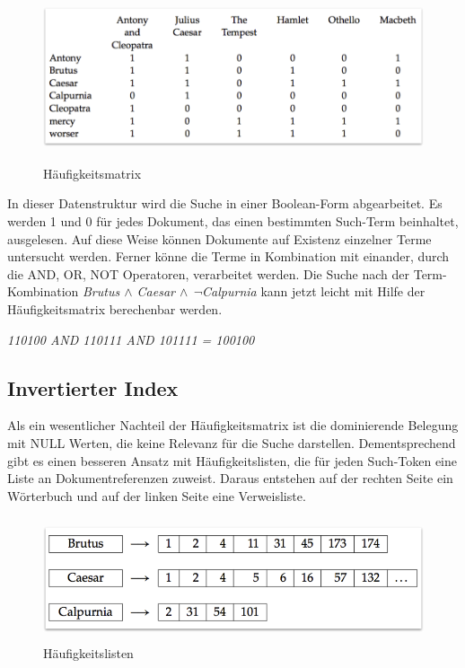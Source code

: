 \begin{figure}
\centering
\includegraphics[width=13.54cm,height=4.955cm]{bilder/SeminararbeitArkadij-img1.png}
\caption {Häufigkeitsmatrix \cite {manning2008introduction}}
\label{manning2008introduction}
\end{figure}

\pagebreak
In dieser Datenstruktur wird die Suche in einer Boolean-Form
abgearbeitet. Es werden {\textquotedbl}1{\textquotedbl} und
{\textquotedbl}0{\textquotedbl} für jedes Dokument, das einen
bestimmten Such-Term beinhaltet, ausgelesen. Auf diese Weise können
Dokumente auf Existenz einzelner Terme untersucht werden. Ferner könne
die Terme in Kombination mit einander, durch die AND, OR, NOT
Operatoren, verarbeitet werden.
\bigbreak
Die Suche nach der Term-Kombination \textit{Brutus ${\wedge}$ Caesar ${\wedge}$
¬Calpurnia} kann jetzt leicht mit Hilfe der Häufigkeitsmatrix
berechenbar werden.
\bigbreak
\begin{center}
\textit{110100 AND 110111 AND 101111 = 100100}
\end{center}

\subsection[Invertierter Index]{Invertierter Index}
Als ein wesentlicher Nachteil der Häufigkeitsmatrix ist die dominierende
Belegung mit NULL Werten, die keine Relevanz für die Suche darstellen.
Dementsprechend gibt es einen besseren Ansatz mit Häufigkeitslisten,
die für jeden Such-Token eine Liste an Dokumentreferenzen zuweist.
Daraus entstehen auf der rechten Seite ein Wörterbuch und auf der
linken Seite eine Verweisliste. 

\begin{figure}
\centering
\includegraphics[width=13.143cm,height=3.634cm]{bilder/SeminararbeitArkadij-img2.png}
\caption {Häufigkeitslisten \cite {manning2008introduction}}
\end{figure}

